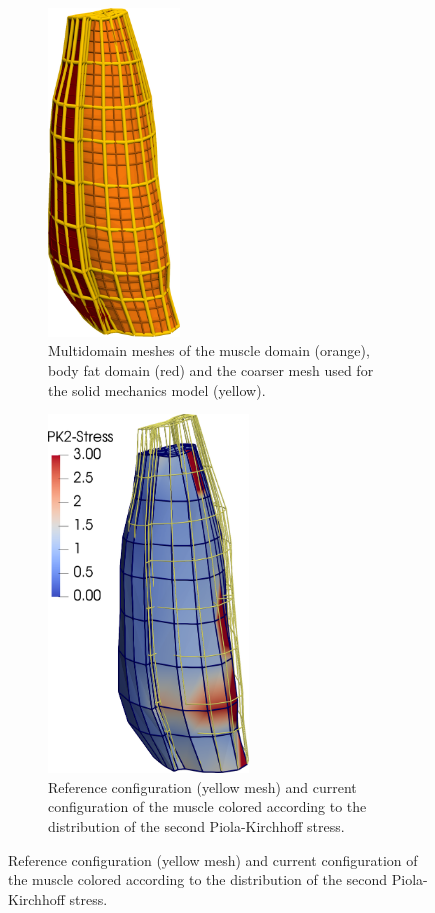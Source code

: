 \begin{figure}
  \centering%
  \hfill
  \begin{subfigure}[t]{0.31\textwidth}%
    \centering%
    \includegraphics[height=87mm]{images/results/application/multidomain_prestretch5.png}%
    \caption{Multidomain meshes of the muscle domain (orange), body fat domain (red) and the coarser mesh used for the solid mechanics model (yellow).}%
    \label{fig:multidomain_prestretch5}%
  \end{subfigure}
  \begin{subfigure}[t]{0.31\textwidth}%
    \centering%
    \includegraphics[height=95mm]{images/results/application/multidomain_prestretch6.png}%
    \caption{Reference configuration (yellow mesh) and current configuration of the muscle colored according to the distribution of the second Piola-Kirchhoff stress.}%

\end{subfigure}
\end{figure}
